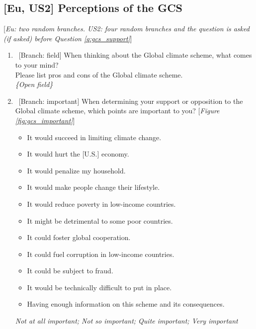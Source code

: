 \subsection*{[Eu, US2] Perceptions of the GCS}\label{subsec:questionnaire_perceptions}
[\textit{Eu: two random branches. US2: four random branches and the question is asked (if asked) before Question \ref{q:gcs_support}}]
\begin{enumerate}[resume] \item ~[Branch: field] \label{q:gcs_field} When thinking about the Global climate scheme, what comes to your mind? \\ Please list pros and cons of the Global climate scheme.
\\ \textit{\{Open field\}} 
\item ~[Branch: important] \label{q:gcs_important} When determining your support or opposition to the Global climate scheme, which points are important to you? [\textit{Figure \ref{fig:gcs_important}}]
\begin{itemize}
    \item It would succeed in limiting climate change. 
    \item It would hurt the [U.S.] economy. 
    \item It would penalize my household. 
    \item It would make people change their lifestyle. 
    \item It would reduce poverty in low-income countries. 
    \item It might be detrimental to some poor countries. 
    \item It could foster global cooperation. 
    \item It could fuel corruption in low-income countries. 
    \item It could be subject to fraud. 
    \item It would be technically difficult to put in place. 
    \item Having enough information on this scheme and its consequences. 
\end{itemize}
\textit{Not at all important; Not so important; Quite important; Very important}
\end{enumerate}


